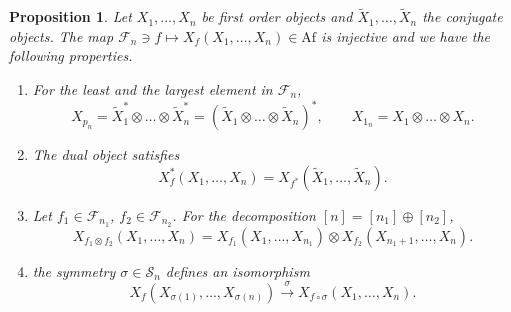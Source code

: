 \documentclass[12pt]{article}
\newtheorem{prop}{Proposition}
\theoremstyle{definition}
\theoremstyle{remark}
\def\Fe{\mathcal F}
\def\permut{\mathscr{S}}
\def \Af{\mathrm{Af}}
\begin{document}
\begin{prop}\label{prop:Xf_const} Let $X_1,\dots,X_n$ be first order objects and $\tilde
X_1,\dots,\tilde X_n$ the conjugate objects. 
The map $\Fe_n\ni f\mapsto X_f(X_1,\dots,X_n)\in \Af$ is injective and we have the
following properties. 
\begin{enumerate}
\item[(i)] For the least and the largest element in $\Fe_n$, 
\[
X_{p_{n}}=\tilde X_1^*\otimes \dots\otimes \tilde X_n^*=(\tilde X_1\otimes \dots\otimes
\tilde X_n)^*,\qquad
X_{1_n}=X_1\otimes\dots\otimes X_n.
\]

\item[(ii)] The dual object satisfies
\[
X_f^*(X_1,\dots,X_n)=X_{f^*}(\tilde X_1,\dots,\tilde X_n).
\]
\item[(iii)] Let $f_1\in \Fe_{n_1}$, $f_2\in \Fe_{n_2}$. For the decomposition
$[n]=[n_1]\oplus[n_2]$,
\[
X_{f_1\otimes f_2}(X_1,\dots,X_n)=X_{f_1}(X_1,\dots, X_{n_1})\otimes
X_{f_2}(X_{n_1+1},\dots,X_n).
\]
\item[(iv)]  {\color{red} the symmetry $\sigma\in \permut_n$ defines an isomorphism} 
\[
X_f(X_{\sigma(1)},\dots,
X_{\sigma(n)})\xrightarrow{\sigma} X_{f\circ\sigma}(X_1,\dots,X_n).
\]
\end{enumerate}
\end{prop}
\end{document}
